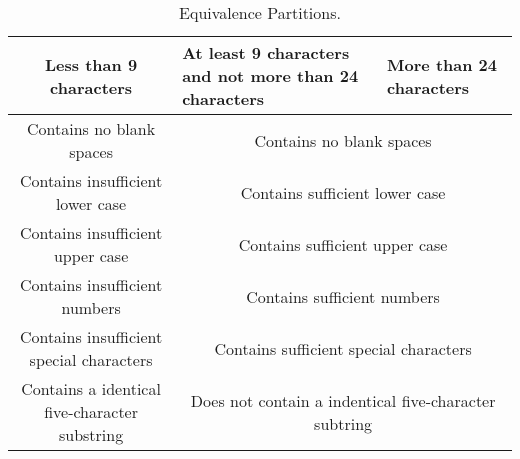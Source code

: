 \documentclass[12pt,letterpaper]{article}
\begin{document}
\begin{table}[h!]
  \begin{center}
    \caption{Equivalence Partitions.}
    \label{tab:table1}
    
    \begin{tabular}{||c|m{4cm}|m{5cm}||}
    \hline
    Less than 9 characters & At least 9 characters and not more than 24
    characters & More than 24 characters \\
    
    \hline \hline
    \multicolumn{1}{||c|}{Contains no blank spaces} & \multicolumn{2}{c||}{Contains no blank spaces} \\
    
    \hline \hline
    \multicolumn{1}{||c|}{Contains insufficient lower case} 
    & \multicolumn{2}{c||}{Contains sufficient lower case} \\
    
    \hline \hline
    \multicolumn{1}{||c|}{Contains insufficient upper case} 
    & \multicolumn{2}{c||}{Contains sufficient upper case} \\
    
    \hline \hline
    \multicolumn{1}{||c|}{Contains insufficient numbers} 
    & \multicolumn{2}{c||}{Contains sufficient numbers} \\
    
    \hline \hline
    \multicolumn{1}{||c|}{Contains insufficient special characters} 
    & \multicolumn{2}{c||}{Contains sufficient special characters} \\
    
    \hline \hline
    \multicolumn{1}{||c|}{Contains a identical five-character substring}
    & \multicolumn{2}{c||}{Does not contain a indentical five-character subtring} \\
    \hline
    \end{tabular}
  \end{center}
\end{table}
\end{document}
